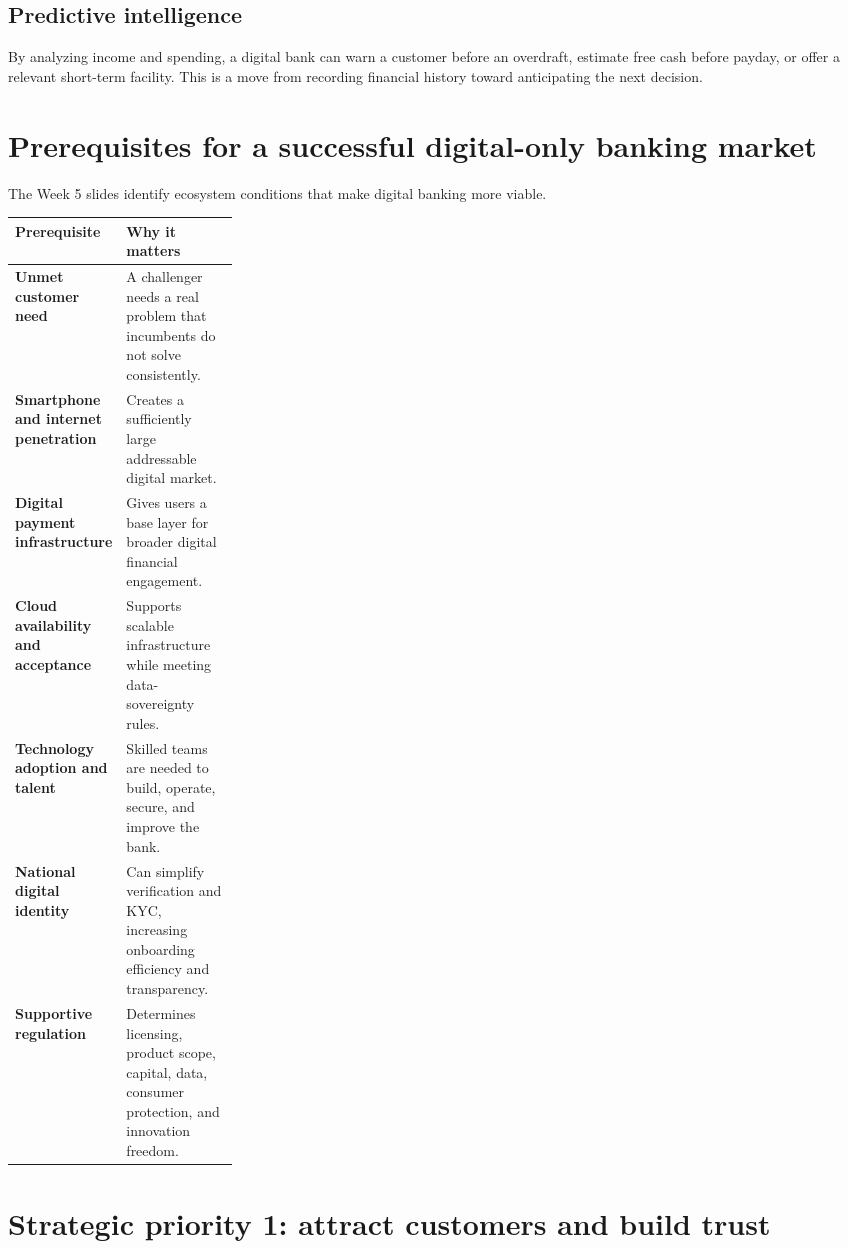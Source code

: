 \subsection{Predictive intelligence}

By analyzing income and spending, a digital bank can warn a customer before an overdraft, estimate free cash before payday, or offer a relevant short-term facility. This is a move from recording financial history toward anticipating the next decision.

\section{Prerequisites for a successful digital-only banking market}

The Week 5 slides identify ecosystem conditions that make digital banking more viable.

\begin{mltable}
\begin{tabularx}{\linewidth}{@{}>{\bfseries\color{MLNavy}}p{0.26\linewidth}X@{}}
\toprule
\rowcolor{MLPaleBlue!92}
Prerequisite & Why it matters \\
\midrule
Unmet customer need & A challenger needs a real problem that incumbents do not solve consistently. \\
Smartphone and internet penetration & Creates a sufficiently large addressable digital market. \\
Digital payment infrastructure & Gives users a base layer for broader digital financial engagement. \\
Cloud availability and acceptance & Supports scalable infrastructure while meeting data-sovereignty rules. \\
Technology adoption and talent & Skilled teams are needed to build, operate, secure, and improve the bank. \\
National digital identity & Can simplify verification and KYC, increasing onboarding efficiency and transparency. \\
Supportive regulation & Determines licensing, product scope, capital, data, consumer protection, and innovation freedom. \\
\bottomrule
\end{tabularx}
\end{mltable}

\section{Strategic priority 1: attract customers and build trust}

